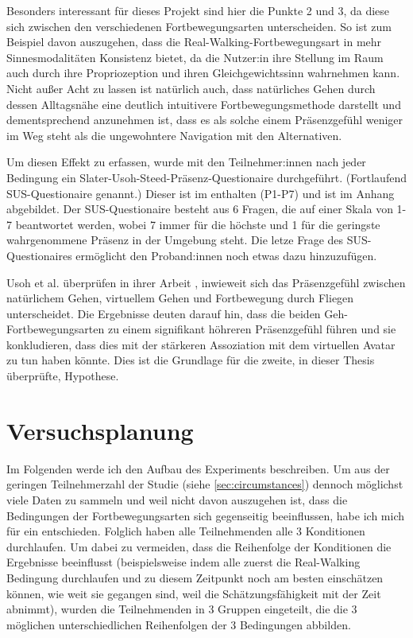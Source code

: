             Besonders interessant für dieses Projekt sind hier die Punkte 2 und 3, da diese sich zwischen den verschiedenen Fortbewegungsarten unterscheiden. So ist zum Beispiel davon auszugehen, dass die Real-Walking-Fortbewegungsart in mehr Sinnesmodalitäten Konsistenz bietet, da die Nutzer:in ihre Stellung im Raum auch durch ihre Propriozeption und ihren Gleichgewichtssinn wahrnehmen kann.
            Nicht außer Acht zu lassen ist natürlich auch, dass natürliches Gehen durch dessen Alltagsnähe eine deutlich intuitivere Fortbewegungsmethode darstellt und dementsprechend anzunehmen ist, dass es als solche einem Präsenzgefühl weniger im Weg steht als die ungewohntere Navigation mit den Alternativen.

            Um diesen Effekt zu erfassen, wurde mit den Teilnehmer:innen nach jeder Bedingung ein Slater-Usoh-Steed-Präsenz-Questionaire \cite{presence-questionaire} durchgeführt. (Fortlaufend SUS-Questionaire genannt.) Dieser ist im  enthalten (P1-P7) und ist im Anhang abgebildet. Der SUS-Questionaire besteht aus 6 Fragen, die auf einer Skala von 1-7 beantwortet werden, wobei 7 immer für die höchste und 1 für die geringste wahrgenommene Präsenz in der Umgebung steht. Die letze Frage des SUS-Questionaires ermöglicht den Proband:innen noch etwas dazu hinzuzufügen.

            Usoh et al. überprüfen in ihrer Arbeit \cite{usoh-vergleich-1999}, inwieweit sich das Präsenzgefühl zwischen natürlichem Gehen, virtuellem Gehen und Fortbewegung durch Fliegen unterscheidet. Die Ergebnisse deuten darauf hin, dass die beiden Geh-Fortbewegungsarten zu einem signifikant höhreren Präsenzgefühl führen und sie konkludieren, dass dies mit der stärkeren Assoziation mit dem virtuellen Avatar zu tun haben könnte. Dies ist die Grundlage für die zweite, in dieser Thesis überprüfte, Hypothese.



    \section{Versuchsplanung}\label{sec:setup}
    Im Folgenden werde ich den Aufbau des Experiments beschreiben.
    Um aus der geringen Teilnehmerzahl der Studie (siehe \autoref{sec:circumstances})
    dennoch möglichst viele Daten zu sammeln und weil nicht davon auszugehen ist, dass die Bedingungen der Fortbewegungsarten sich gegenseitig beeinflussen, habe ich mich für ein  entschieden. Folglich haben alle Teilnehmenden alle 3 Konditionen durchlaufen. Um dabei zu vermeiden, dass die Reihenfolge der Konditionen die Ergebnisse beeinflusst (beispielsweise indem alle zuerst die Real-Walking Bedingung durchlaufen und zu diesem Zeitpunkt noch am besten einschätzen können, wie weit sie gegangen sind, weil die Schätzungsfähigkeit mit der Zeit abnimmt), wurden die Teilnehmenden in 3 Gruppen eingeteilt, die die 3 möglichen unterschiedlichen Reihenfolgen der 3 Bedingungen abbilden.

